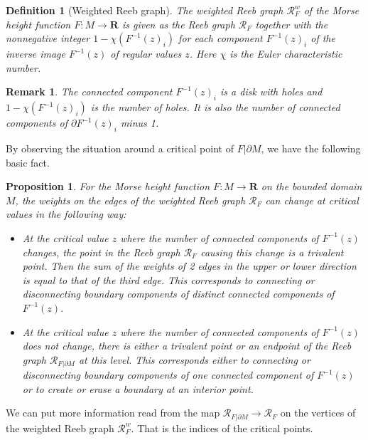 \documentclass{amsart}
\newtheorem{proposition}[theorem]{Proposition}
\newtheorem{definition}[theorem]{Definition}
\newtheorem{remark}[theorem]{Remark}
\numberwithin{equation}{section}
\newcommand{\RR}{{\boldsymbol{R}}}
\newcommand{\lra}{\longrightarrow}
\newcommand{\bd}{\partial}
\begin{document}
\begin{definition}[Weighted Reeb graph] The weighted Reeb graph
$\mathcal{R}_{F}^w$ of the Morse height function $F:M\lra \RR$ is given as the Reeb graph $\mathcal{R}_{F}$ together with the nonnegative integer $1-\chi(F^{-1}(z)_i)$ for each component $F^{-1}(z)_i$ of the inverse image $F^{-1}(z)$ of regular values $z$. Here $\chi$ is the Euler characteristic number.
\end{definition}

\begin{remark} 
The connected component $F^{-1}(z)_i$ is a disk with holes and $1-\chi(F^{-1}(z)_i)$ is the number of holes. It is also the number of connected components of $\bd F^{-1}(z)_i$ minus 1.
\end{remark}




By observing the situation around a critical point of $F|\bd M$, we have the following basic fact.

\begin{proposition}\label{prop:weight}
For the Morse height function $F:M\lra \RR$ on the bounded domain $M$, the weights on the edges of the weighted Reeb graph $\mathcal{R}_F$ can change at critical values in the following way:
\begin{itemize}
\item[(1)] 
At the critical value $z$ where the number of connected components of $F^{-1}(z)$ changes, the point in the Reeb graph $\mathcal{R}_F$ causing this change is a trivalent point. Then the sum of the weights of 2 edges in the upper or lower direction is equal to that of the third edge. This corresponds to connecting or disconnecting boundary components of distinct connected components of $F^{-1}(z)$. 
\item[(2)]
At the critical value $z$ where the number of connected components of $F^{-1}(z)$ does not change, there is either a trivalent point or an endpoint of the Reeb graph $\mathcal{R}_{F|\bd M}$ at this level. 
This corresponds either to connecting or disconnecting boundary components of one connected component of $F^{-1}(z)$ or to create or erase a boundary at an interior point. 
\end{itemize}
\end{proposition}

We can put more information read from the map $\mathcal{R}_{F|\bd M}\lra\mathcal{R}_F$ on the vertices of the weighted Reeb graph $\mathcal{R}_F^w$. That is the indices of the critical points. 
\end{document}
